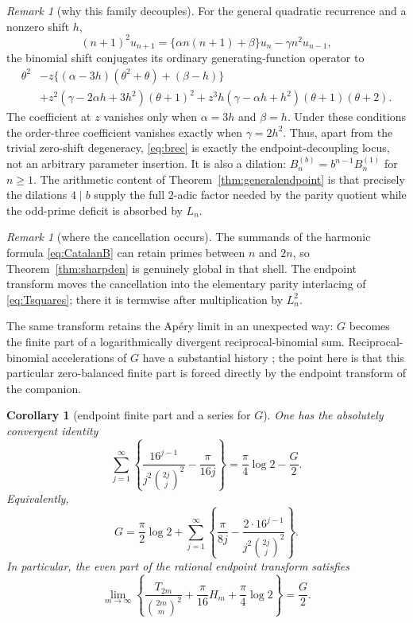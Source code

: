 \documentclass[11pt]{article}
\newtheorem{corollary}[theorem]{Corollary}
\theoremstyle{definition}
\theoremstyle{remark}
\newtheorem{remark}[theorem]{Remark}
\begin{document}
\begin{remark}[why this family decouples]\label{rem:endpointlocus}
For the general quadratic recurrence and a nonzero shift $h$,
\[
 (n+1)^2u_{n+1}
 =\{\alpha n(n+1)+\beta\}u_n-\gamma n^2u_{n-1},
\]
the binomial shift conjugates its ordinary generating-function operator to
\begin{align*}
 \theta^2
 &-z\{(\alpha-3h)(\theta^2+\theta)+(\beta-h)\}\\
 &+z^2(\gamma-2\alpha h+3h^2)(\theta+1)^2
 +z^3h(\gamma-\alpha h+h^2)(\theta+1)(\theta+2).
\end{align*}
The coefficient at $z$ vanishes only when $\alpha=3h$ and $\beta=h$.  Under these
conditions the order-three coefficient vanishes exactly when $\gamma=2h^2$.  Thus,
apart from the trivial zero-shift
degeneracy, \eqref{eq:brec} is exactly the endpoint-decoupling locus, not an arbitrary
parameter insertion.  It is also a dilation:
$B^{(b)}_n=b^{n-1}B^{(1)}_n$ for $n\ge1$.  The arithmetic content of
Theorem~\ref{thm:generalendpoint} is that precisely the dilations $4\mid b$ supply the
full $2$-adic factor needed by the parity quotient while the odd-prime deficit is
absorbed by $L_n$.
\end{remark}

\begin{remark}[where the cancellation occurs]\label{rem:sharpden}
The summands of the harmonic formula \eqref{eq:CatalanB} can retain primes between
$n$ and $2n$, so Theorem~\ref{thm:sharpden} is genuinely global in that shell.  The
endpoint transform moves the cancellation into the elementary parity interlacing of
\eqref{eq:Tsquares}; there it is termwise after multiplication by $L_n^2$.
\end{remark}

The same transform retains the Ap\'ery limit in an unexpected way: $G$ becomes the
finite part of a logarithmically divergent reciprocal-binomial sum.  Reciprocal-binomial
accelerations of $G$ have a substantial history \cite{BradleyCatalan}; the point here is
that this particular zero-balanced finite part is forced directly by the endpoint
transform of the companion.

\begin{corollary}[endpoint finite part and a series for $G$]\label{cor:Gfinitepart}
One has the absolutely convergent identity
\begin{equation}\label{eq:Grecipseries}
 \sum_{j=1}^{\infty}\left\{
  \frac{16^{j-1}}{j^2\binom{2j}{j}^2}-\frac{\pi}{16j}\right\}
 =\frac{\pi}{4}\log2-\frac G2.
\end{equation}
Equivalently,
\begin{equation}\label{eq:Grecipseries2}
 G=\frac{\pi}{2}\log2+
 \sum_{j=1}^{\infty}\left\{
  \frac{\pi}{8j}-\frac{2\cdot16^{j-1}}{j^2\binom{2j}{j}^2}\right\}.
\end{equation}
In particular, the even part of the rational endpoint transform satisfies
\begin{equation}\label{eq:Tevenfinitepart}
 \lim_{m\to\infty}\left\{
  \frac{T_{2m}}{\binom{2m}{m}^2}+\frac{\pi}{16}H_m
  +\frac{\pi}{4}\log2\right\}=\frac G2.
\end{equation}
\end{corollary}
\end{document}

